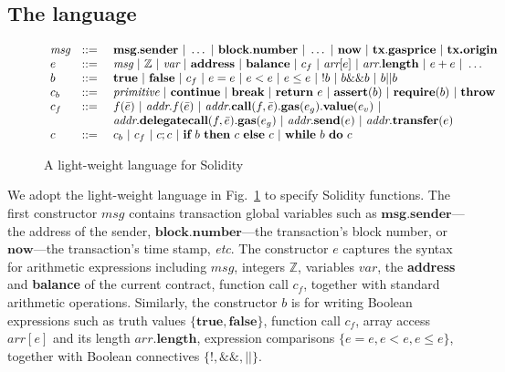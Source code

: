 \subsection{The language}
\begin{figure}
$
\begin{array}{lcl}
\textit{msg}&::=~&\textbf{msg}.\textbf{sender}~|~\ldots~|~\textbf{block}.\textbf{number}~|~\ldots~|~\textbf{now}~|~\textbf{tx}.\textbf{gasprice}~|~\textbf{tx.origin}\\
e&::=~&\textit{msg}~|~\mathbb{Z}~|~\textit{var}~|~\textbf{address}~|~\textbf{balance}~|~c_f~|~\textit{arr}[e]~|~\textit{arr}.\textbf{length}~|~e + e~|~ \ldots\\
b&::=~&\textbf{true}~|~\textbf{false}~|~c_f~|~ e = e~|~ e < e~|~e \leq e ~|~ !b~|~ b \&\& b  ~|~ b || b
\\
c_b&::=~&\textit{primitive}~|~\textbf{continue}~|~\textbf{break}~|~\textbf{return}~e~|~\textbf{assert}(b)~|~\textbf{require}(b)~|~\textbf{throw}\\
c_f&::=~&f(\bar{e})~|~\textit{addr}.f(\bar{e})~|~\textit{addr}.\textbf{call}(f,\bar{e}).\textbf{gas}(e_g).\textbf{value}(e_v)~|~\\
&&\textit{addr}.\textbf{delegatecall}(f,\bar{e}).\textbf{gas}(e_g)~|~\textit{addr}.\textbf{send}(e)~|~\textit{addr}.\textbf{transfer}(e)\\
c&::=~&c_b~|~c_f~|~c;c~|~\textbf{if}~b~\textbf{then}~c~\textbf{else}~c~|~\textbf{while}~b~\textbf{do}~c
\end{array}
$
\caption{A light-weight language for Solidity}\label{fig:lang}
\end{figure}


We adopt the light-weight language in Fig.~\ref{fig:lang} to specify Solidity functions. The first constructor $\textit{msg}$ contains transaction global variables such as $\textbf{msg.sender}$---the address of the sender, $\textbf{block.number}$---the transaction's block number, or $\textbf{now}$---the transaction's time stamp, \emph{etc}. The constructor $e$ captures the syntax for arithmetic expressions including $\textit{msg}$, integers $\mathbb{Z}$, variables $\textit{var}$, the \textbf{address} and \textbf{balance} of the current contract, function call $c_f$, together with standard arithmetic operations. Similarly, the constructor $b$ is for writing Boolean expressions such as truth values $\{\textbf{true},\textbf{false}\}$, function call $c_f$, array access $\textit{arr}[e]$ and its length $\textit{arr}.\textbf{length}$, expression comparisons $\{e=e,e < e,e \leq e\}$, together with Boolean connectives $\{!,\&\&,||\}$. 


